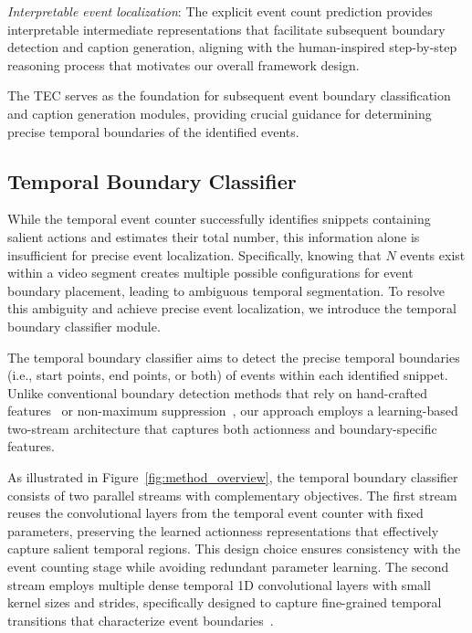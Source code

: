 \textit{Interpretable event localization}: The explicit event count prediction provides interpretable intermediate representations that facilitate subsequent boundary detection and caption generation, aligning with the human-inspired step-by-step reasoning process that motivates our overall framework design.

The TEC serves as the foundation for subsequent event boundary classification and caption generation modules, providing crucial guidance for determining precise temporal boundaries of the identified events.



\subsection{Temporal Boundary Classifier}
\label{subsec:method_temporal_boundary_classifier}
While the temporal event counter successfully identifies snippets containing salient actions and estimates their total number, this information alone is insufficient for precise event localization. Specifically, knowing that $N$ events exist within a video segment creates multiple possible configurations for event boundary placement, leading to ambiguous temporal segmentation. To resolve this ambiguity and achieve precise event localization, we introduce the temporal boundary classifier module.

The temporal boundary classifier aims to detect the precise temporal boundaries (i.e., start points, end points, or both) of events within each identified snippet. Unlike conventional boundary detection methods that rely on hand-crafted features~\cite{lin2018bsn} or non-maximum suppression~\cite{hosang2017learning}, our approach employs a learning-based two-stream architecture that captures both actionness and boundary-specific features.

As illustrated in Figure~\ref{fig:method_overview}, the temporal boundary classifier consists of two parallel streams with complementary objectives. The first stream reuses the convolutional layers from the temporal event counter with fixed parameters, preserving the learned actionness representations that effectively capture salient temporal regions. This design choice ensures consistency with the event counting stage while avoiding redundant parameter learning. The second stream employs multiple dense temporal 1D convolutional layers with small kernel sizes and strides, specifically designed to capture fine-grained temporal transitions that characterize event boundaries~\cite{lin2019bmn,zhao2020bottom}.

